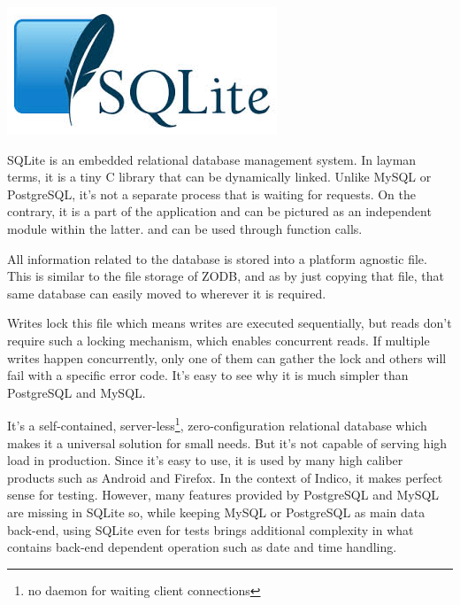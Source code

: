 \vspace{-1.15cm} \hspace{3cm} \includegraphics[scale=0.2]{3/figures/sqlite.jpg}

SQLite is an embedded relational database management system. In layman terms, it is a tiny C library that can be dynamically linked. Unlike MySQL or PostgreSQL, it's not a separate process that is waiting for requests. On the contrary, it is a part of the application and can be pictured as an independent module within the latter. and can be used through function calls.

All information related to the database is stored into a platform agnostic file. This is similar to the file storage of ZODB, and as by just copying that file, that same database can easily moved to wherever it is required.

Writes lock this file which means writes are executed sequentially, but reads don't require such a locking mechanism, which enables concurrent reads. If multiple writes happen concurrently, only one of them can gather the lock and others will fail with a specific error code. It's easy to see why it is much simpler than PostgreSQL and MySQL.

It's a self-contained, server-less\footnote{no daemon for waiting client connections}, zero-configuration relational database which makes it a universal solution for small needs. But it's not capable of serving high load in production. Since it's easy to use, it is used by many high caliber products such as Android and Firefox. In the context of Indico, it makes perfect sense for testing. However, many features provided by PostgreSQL and MySQL are missing in SQLite so, while keeping MySQL or PostgreSQL as main data back-end, using SQLite even for tests brings additional complexity in what contains back-end dependent operation such as date and time handling.

